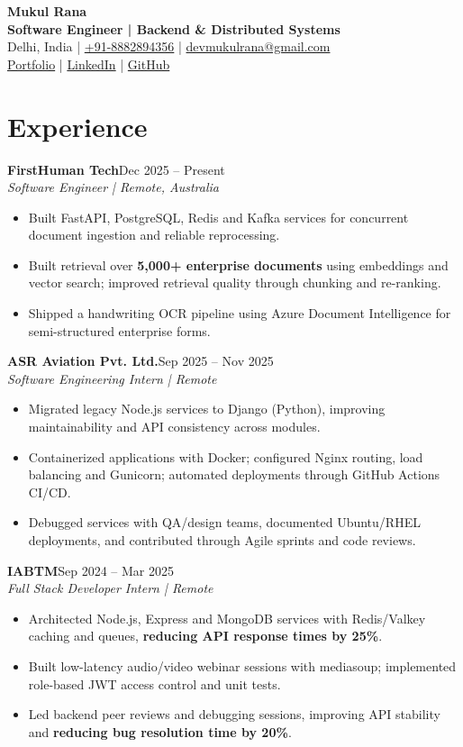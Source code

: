 \documentclass[letterpaper,10pt]{article}
\newcommand{\entry}[4]{%
  \textbf{#1}\hfill #2\\
  \textit{#3}\hfill #4\par
}
\begin{document}
\fontsize{10.5pt}{12.3pt}\selectfont
\raggedright
{}
\begin{center}
{\LARGE\textbf{Mukul Rana}}\\[2pt]
\textbf{Software Engineer | Backend \& Distributed Systems}\\[1pt]
Delhi, India | \href{tel:+918882894356}{+91-8882894356} |
\href{mailto:devmukulrana@gmail.com}{devmukulrana@gmail.com}\\
\href{https://mukulranadev.in}{Portfolio} |
\href{https://linkedin.com/in/mukul-webdev}{LinkedIn} |
\href{https://github.com/mukulpythondev}{GitHub}
\end{center}
\vspace{-8pt}

\section*{Experience}
\entry{FirstHuman Tech}{Dec 2025 -- Present}{Software Engineer | Remote, Australia}{}
\begin{itemize}
  \item Built FastAPI, PostgreSQL, Redis and Kafka services for concurrent document ingestion and reliable reprocessing.
  \item Built retrieval over \textbf{5,000+ enterprise documents} using embeddings and vector search; improved retrieval quality through chunking and re-ranking.
  \item Shipped a handwriting OCR pipeline using Azure Document Intelligence for semi-structured enterprise forms.
\end{itemize}
\vspace{3pt}
\entry{ASR Aviation Pvt. Ltd.}{Sep 2025 -- Nov 2025}{Software Engineering Intern | Remote}{}
\begin{itemize}
  \item Migrated legacy Node.js services to Django (Python), improving maintainability and API consistency across modules.
  \item Containerized applications with Docker; configured Nginx routing, load balancing and Gunicorn; automated deployments through GitHub Actions CI/CD.
  \item Debugged services with QA/design teams, documented Ubuntu/RHEL deployments, and contributed through Agile sprints and code reviews.
\end{itemize}
\vspace{3pt}
\entry{IABTM}{Sep 2024 -- Mar 2025}{Full Stack Developer Intern | Remote}{}
\begin{itemize}
  \item Architected Node.js, Express and MongoDB services with Redis/Valkey caching and queues, \textbf{reducing API response times by 25\%}.
  \item Built low-latency audio/video webinar sessions with mediasoup; implemented role-based JWT access control and unit tests.
  \item Led backend peer reviews and debugging sessions, improving API stability and \textbf{reducing bug resolution time by 20\%}.
\end{itemize}
\end{document}
